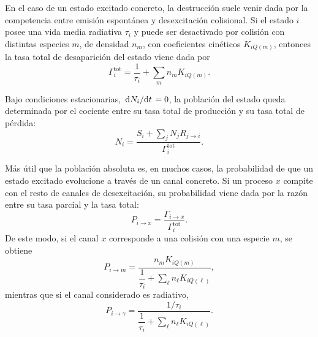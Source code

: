 \documentclass[12pt,a4paper]{article}
\begin{document}
En el caso de un estado excitado concreto, la destrucción suele venir dada por la competencia entre emisión espontánea y desexcitación colisional. Si el estado \(i\) posee una vida media radiativa \(\tau_i\) y puede ser desactivado por colisión con distintas especies \(m\), de densidad \(n_m\), con coeficientes cinéticos \(K_{iQ(m)}\), entonces la tasa total de desaparición del estado viene dada por
\begin{equation}
    \Gamma_i^{\text{tot}}
    =
    \frac{1}{\tau_i}
    +
    \sum_m n_m K_{iQ(m)}.
    \label{eq:total_loss_rate}
\end{equation}

Bajo condiciones estacionarias, \(\dv*{N_i}{t}=0\), la población del estado queda determinada por el cociente entre su tasa total de producción y su tasa total de pérdida:
\begin{equation}
    N_i
    =
    \frac{S_i + \sum_j N_j R_{j\to i}}
    {\Gamma_i^{\text{tot}}}.
    \label{eq:stationary_population}
\end{equation}

Más útil que la población absoluta es, en muchos casos, la probabilidad de que un estado excitado evolucione a través de un canal concreto. Si un proceso \(x\) compite con el resto de canales de desexcitación, su probabilidad viene dada por la razón entre su tasa parcial y la tasa total:
\begin{equation}
    P_{i\to x}
    =
    \frac{\Gamma_{i\to x}}
    {\Gamma_i^{\text{tot}}}.
    \label{eq:branching_ratio_general}
\end{equation}
De este modo, si el canal \(x\) corresponde a una colisión con una especie \(m\), se obtiene
\begin{equation}
    P_{i\to m}
    =
    \frac{n_m K_{iQ(m)}}
    {\dfrac{1}{\tau_i} + \sum_\ell n_\ell K_{iQ(\ell)}},
    \label{eq:branching_collision}
\end{equation}
mientras que si el canal considerado es radiativo,
\begin{equation}
    P_{i\to \gamma}
    =
    \frac{1/\tau_i}
    {\dfrac{1}{\tau_i} + \sum_\ell n_\ell K_{iQ(\ell)}}.
    \label{eq:branching_radiative}
\end{equation}
\end{document}
